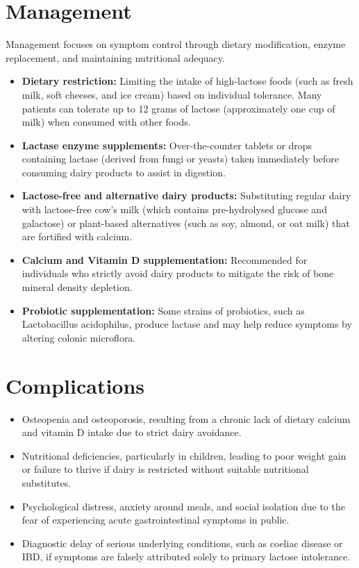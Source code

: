 \section*{Management}
Management focuses on symptom control through dietary modification, enzyme replacement, and maintaining nutritional adequacy.

\begin{itemize}
    \item \textbf{Dietary restriction:} Limiting the intake of high-lactose foods (such as fresh milk, soft cheeses, and ice cream) based on individual tolerance. Many patients can tolerate up to 12 grams of lactose (approximately one cup of milk) when consumed with other foods.
    \item \textbf{Lactase enzyme supplements:} Over-the-counter tablets or drops containing lactase (derived from fungi or yeasts) taken immediately before consuming dairy products to assist in digestion.
    \item \textbf{Lactose-free and alternative dairy products:} Substituting regular dairy with lactose-free cow's milk (which contains pre-hydrolysed glucose and galactose) or plant-based alternatives (such as soy, almond, or oat milk) that are fortified with calcium.
    \item \textbf{Calcium and Vitamin D supplementation:} Recommended for individuals who strictly avoid dairy products to mitigate the risk of bone mineral density depletion.
    \item \textbf{Probiotic supplementation:} Some strains of probiotics, such as Lactobacillus acidophilus, produce lactase and may help reduce symptoms by altering colonic microflora.
\end{itemize}

\section*{Complications}
\begin{itemize}
    \item Osteopenia and osteoporosis, resulting from a chronic lack of dietary calcium and vitamin D intake due to strict dairy avoidance.
    \item Nutritional deficiencies, particularly in children, leading to poor weight gain or failure to thrive if dairy is restricted without suitable nutritional substitutes.
    \item Psychological distress, anxiety around meals, and social isolation due to the fear of experiencing acute gastrointestinal symptoms in public.
    \item Diagnostic delay of serious underlying conditions, such as coeliac disease or IBD, if symptoms are falsely attributed solely to primary lactose intolerance.
\end{itemize}

